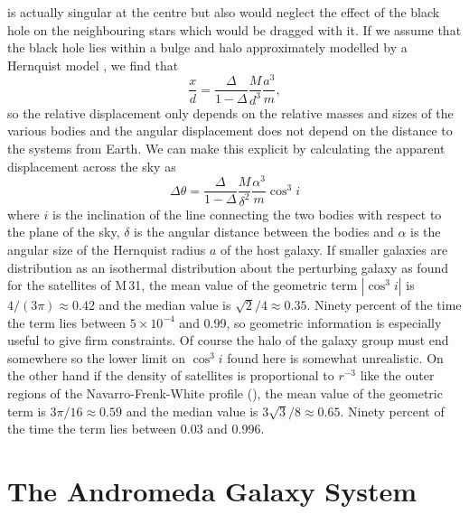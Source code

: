 \documentclass[useAMS,usenatbib]{mn2e}
\begin{document}
is actually singular at the centre but also would neglect the effect
of the black hole on the neighbouring stars which would be dragged
with it.  If we assume that the black hole lies within a bulge and
halo approximately modelled by a Hernquist model \citep[as
  in][]{1997ApJ...487..153V}, we find that
\begin{equation}
  \frac{x}{d} = 
\frac{\Delta}{1-\Delta} \frac{M}{d^3} \frac{a^3}{m},
  \label{eq:13}
\end{equation}
so the relative displacement only depends on the relative masses and
sizes of the various bodies and the angular displacement does not
depend on the distance to the systems from Earth.  We can make this
explicit by calculating the apparent displacement across the sky as
\begin{equation}
  \Delta \theta = \frac{\Delta}{1-\Delta} \frac{M}{\delta^2} \frac{\alpha^3}{m} \cos^3 i
\end{equation}
where $i$ is the inclination of the line connecting the two bodies
with respect to the plane of the sky, $\delta$ is the angular distance
between the bodies and $\alpha$ is the angular size of the Hernquist
radius $a$ of the host galaxy.  If smaller galaxies are distribution
as an isothermal distribution about the perturbing galaxy as
\citet{2006AJ....131.1405K} found for the satellites of M\,31, the
mean value of the geometric term $|\cos^3i|$ is $4/(3\pi) \approx
0.42$ and the median value is $\sqrt{2}/4\approx 0.35$.  Ninety
percent of the time the term lies between $5\times 10^{-4}$ and 0.99,
so geometric information is especially useful to give firm
constraints.  Of course the halo of the galaxy group must end
somewhere so the lower limit on $\cos^3 i$ found here is somewhat
unrealistic.  On the other hand if the density of satellites is
proportional to $r^{-3}$ like the outer regions of the
Navarro-Frenk-White profile (\citeyear{1996ApJ...462..563N}), the mean
value of the geometric term is $3\pi/16 \approx 0.59$ and the median
value is $3\sqrt{3}/8 \approx 0.65$.  Ninety percent of the time the
term lies between 0.03 and 0.996.

\section{The Andromeda Galaxy System}
\end{document}
